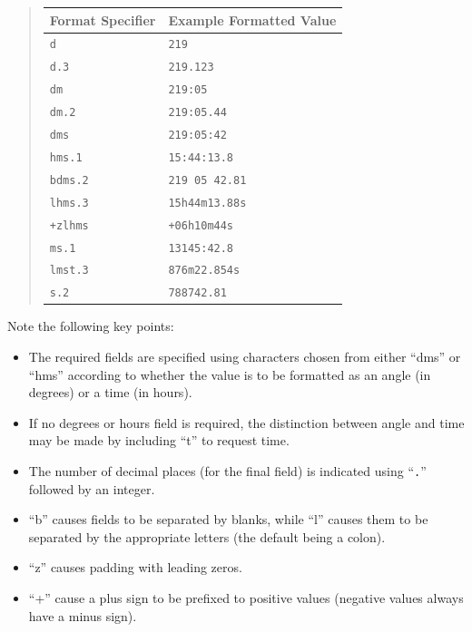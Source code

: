 \documentclass[twoside,11pt]{article}
\begin{document}
\begin{quote}
\begin{center}
\begin{tabular}{|l|l|}
\hline
{\bf{Format Specifier}} & {\bf{Example Formatted Value}}\\
\hline \hline
{\tt{d}} & {\tt{219}}\\
{\tt{d.3}} & {\tt{219.123}}\\
{\tt{dm}} & {\tt{219:05}}\\
{\tt{dm.2}} & {\tt{219:05.44}}\\
{\tt{dms}} & {\tt{219:05:42}}\\
{\tt{hms.1}} & {\tt{15:44:13.8}}\\
{\tt{bdms.2}} & {\tt{219 05 42.81}}\\
{\tt{lhms.3}} & {\tt{15h44m13.88s}}\\
{\tt{+zlhms}} & {\tt{+06h10m44s}}\\
{\tt{ms.1}} & {\tt{13145:42.8}}\\
{\tt{lmst.3}} & {\tt{876m22.854s}}\\
{\tt{s.2}} & {\tt{788742.81}}\\
\hline
\end{tabular}
\end{center}
\end{quote}

Note the following key points:

\begin{itemize}
\item The required fields are specified using characters chosen from
either ``dms'' or ``hms'' according to whether the value is to be
formatted as an angle (in degrees) or a time (in hours).

\item If no degrees or hours field is required, the distinction
between angle and time may be made by including ``t'' to request time.

\item The number of decimal places (for the final field) is indicated
using ``{\tt{.}}'' followed by an integer.

\item ``b'' causes fields to be separated by blanks, while ``l''
causes them to be separated by the appropriate letters (the default
being a colon).

\item ``z'' causes padding with leading zeros.

\item ``+'' cause a plus sign to be prefixed to positive values
(negative values always have a minus sign).
\end{itemize}
\end{document}
